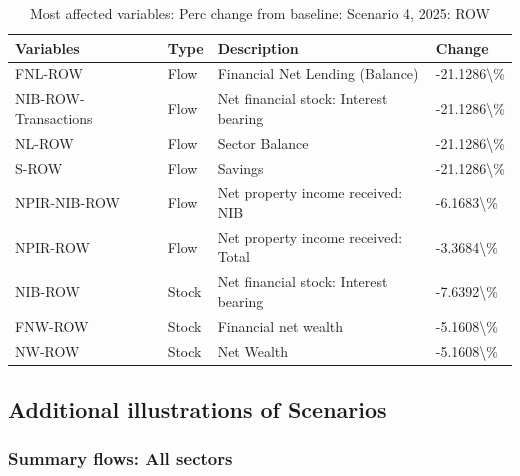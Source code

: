 \documentclass[
]{book}
\begin{document}
\begin{table}

\caption{\label{tab:most-affected-Scenario-4-2025-perc-ROW}Most affected variables: Perc change from baseline: Scenario 4, 2025: ROW}
\centering
\fontsize{10}{12}\selectfont
\begin{tabular}[t]{l|l|l|l}
\hline
Variables & Type & Description & Change\\
\hline
FNL-ROW & Flow & Financial Net Lending (Balance) & -21.1286\textbackslash{}\%\\
\hline
NIB-ROW-Transactions & Flow & Net financial stock: Interest bearing & -21.1286\textbackslash{}\%\\
\hline
NL-ROW & Flow & Sector Balance & -21.1286\textbackslash{}\%\\
\hline
S-ROW & Flow & Savings & -21.1286\textbackslash{}\%\\
\hline
NPIR-NIB-ROW & Flow & Net property income received: NIB & -6.1683\textbackslash{}\%\\
\hline
NPIR-ROW & Flow & Net property income received: Total & -3.3684\textbackslash{}\%\\
\hline
NIB-ROW & Stock & Net financial stock: Interest bearing & -7.6392\textbackslash{}\%\\
\hline
FNW-ROW & Stock & Financial net wealth & -5.1608\textbackslash{}\%\\
\hline
NW-ROW & Stock & Net Wealth & -5.1608\textbackslash{}\%\\
\hline
\end{tabular}
\end{table}

\hypertarget{additional-illustrations-of-scenarios}{%
\subsection{Additional illustrations of Scenarios}\label{additional-illustrations-of-scenarios}}

\hypertarget{summary-flows-all-sectors}{%
\subsubsection{Summary flows: All sectors}\label{summary-flows-all-sectors}}
\end{document}
